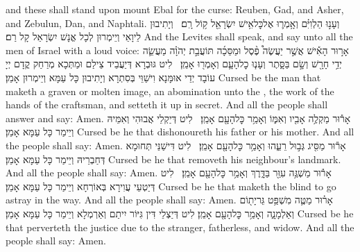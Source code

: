 {and these shall stand upon mount Ebal for the curse: Reuben, Gad, and Asher, and Zebulun, Dan, and Naphtali.}{}
{וְעָנ֣וּ הַלְוִיִּ֗ם וְאָ֥מְר֛וּ אֶל\maqqaf כׇּל\maqqaf אִ֥ישׁ יִשְׂרָאֵ֖ל ק֥וֹל רָֽם׃ \setuma }
{וְיָתִיבוּן לֵיוָאֵי וְיֵימְרוּן לְכָל אֱנָשׁ יִשְׂרָאֵל קָל רַם׃}
{And the Levites shall speak, and say unto all the men of Israel with a loud voice:}{}
{אָר֣וּר הָאִ֡ישׁ אֲשֶׁ֣ר יַעֲשֶׂה֩ פֶ֨סֶל וּמַסֵּכָ֜ה תּוֹעֲבַ֣ת יְהֹוָ֗ה מַעֲשֵׂ֛ה יְדֵ֥י חָרָ֖שׁ וְשָׂ֣ם בַּסָּ֑תֶר וְעָנ֧וּ כׇל\maqqaf הָעָ֛ם וְאָמְר֖וּ אָמֵֽן׃ \setuma }
{לִיט גּוּבְרָא דְּיַעֲבֵיד צֵילַם וּמַתְּכָא מְרַחַק קֳדָם יְיָ עוֹבָד יְדֵי אוּמָּנָא וִישַׁוֵּי בְּסִתְרָא וְיָתִיבוּן כָּל עַמָּא וְיֵימְרוּן אָמֵן׃}
{Cursed be the man that maketh a graven or molten image, an abomination unto the \lord, the work of the hands of the craftsman, and setteth it up in secret. And all the people shall answer and say: Amen.}{}
{אָר֕וּר מַקְלֶ֥ה אָבִ֖יו וְאִמּ֑וֹ וְאָמַ֥ר כׇּל\maqqaf הָעָ֖ם אָמֵֽן׃ \setuma }
{לִיט דְּיַקְלֵי אֲבוּהִי וְאִמֵּיהּ וְיֵימַר כָּל עַמָּא אָמֵן׃}
{Cursed be he that dishonoureth his father or his mother. And all the people shall say: Amen.}{}
{אָר֕וּר מַסִּ֖יג גְּב֣וּל רֵעֵ֑הוּ וְאָמַ֥ר כׇּל\maqqaf הָעָ֖ם אָמֵֽן׃ \setuma }
{לִיט דִּישַׁנֵּי תְּחוּמָא דְּחַבְרֵיהּ וְיֵימַר כָּל עַמָּא אָמֵן׃}
{Cursed be he that removeth his neighbour’s landmark. And all the people shall say: Amen.}{}
{אָר֕וּר מַשְׁגֶּ֥ה עִוֵּ֖ר בַּדָּ֑רֶךְ וְאָמַ֥ר כׇּל\maqqaf הָעָ֖ם אָמֵֽן׃ \setuma }
{לִיט דְּיַטְעֵי עֲוִירָא בְּאוֹרְחָא וְיֵימַר כָּל עַמָּא אָמֵן׃}
{Cursed be he that maketh the blind to go astray in the way. And all the people shall say: Amen.}{}
{אָר֗וּר מַטֶּ֛ה מִשְׁפַּ֥ט גֵּר\maqqaf יָת֖וֹם וְאַלְמָנָ֑ה וְאָמַ֥ר כׇּל\maqqaf הָעָ֖ם אָמֵֽן׃}
{לִיט דְּיַצְלֵי דִּין גִּיּוֹר יִיתַם וְאַרְמְלָא וְיֵימַר כָּל עַמָּא אָמֵן׃}
{Cursed be he that perverteth the justice due to the stranger, fatherless, and widow. And all the people shall say: Amen.}{}
